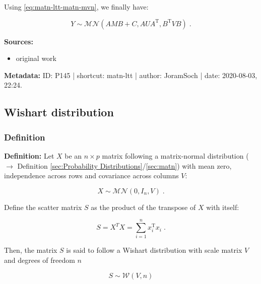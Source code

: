 \documentclass[a4paper,12pt,twoside]{book}
\begin{document}
Using \eqref{eq:matn-ltt-matn-mvn}, we finally have:

\begin{equation} \label{eq:matn-ltt-matn-ltt-qed}
Y \sim \mathcal{MN}(AMB + C, AUA^\mathrm{T} ,B^\mathrm{T}VB) \; .
\end{equation}


\vspace{1em}
\textbf{Sources:}
\begin{itemize}
\item original work\end{itemize}


\vspace{1em}
\textbf{Metadata:} ID: P145 | shortcut: matn-ltt | author: JoramSoch | date: 2020-08-03, 22:24.
\vspace{1em}



\subsection{Wishart distribution}

\subsubsection[\textit{Definition}]{Definition} \label{sec:wish}
\setcounter{equation}{0}

\textbf{Definition:} Let $X$ be an $n \times p$ matrix following a matrix-normal distribution ($\rightarrow$ Definition \ref{sec:Probability Distributions}/\ref{sec:matn}) with mean zero, independence across rows and covariance across columns $V$:

\begin{equation} \label{eq:wish-matn}
X \sim \mathcal{MN}(0, I_n, V) \; .
\end{equation}

Define the scatter matrix $S$ as the product of the transpose of $X$ with itself:

\begin{equation} \label{eq:wish-scat-mat}
S = X^T X = \sum_{i=1}^n x_i^\mathrm{T} x_i \; .
\end{equation}

Then, the matrix $S$ is said to follow a Wishart distribution with scale matrix $V$ and degrees of freedom $n$

\begin{equation} \label{eq:wish-wish}
S \sim \mathcal{W}(V, n)
\end{equation}
\end{document}

